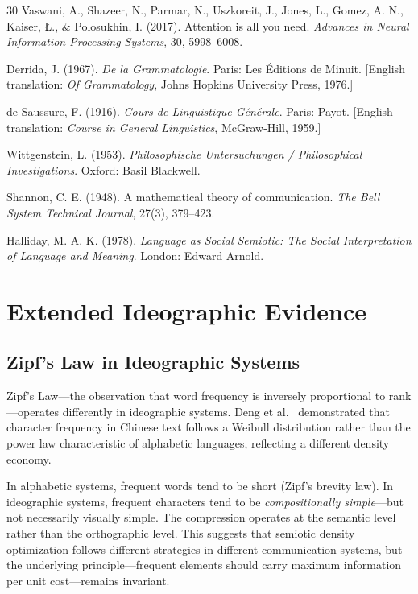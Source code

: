 \documentclass[12pt,a4paper]{article}
\begin{document}
\begin{thebibliography}{30}
Vaswani, A., Shazeer, N., Parmar, N., Uszkoreit, J., Jones, L., Gomez, A. N., Kaiser, {\L}., \& Polosukhin, I. (2017).
Attention is all you need.
\textit{Advances in Neural Information Processing Systems}, 30, 5998--6008.

Derrida, J. (1967).
\textit{De la Grammatologie}.
Paris: Les \'Editions de Minuit.
[English translation: \textit{Of Grammatology}, Johns Hopkins University Press, 1976.]

de Saussure, F. (1916).
\textit{Cours de Linguistique G\'en\'erale}.
Paris: Payot.
[English translation: \textit{Course in General Linguistics}, McGraw-Hill, 1959.]

Wittgenstein, L. (1953).
\textit{Philosophische Untersuchungen / Philosophical Investigations}.
Oxford: Basil Blackwell.

Shannon, C. E. (1948).
A mathematical theory of communication.
\textit{The Bell System Technical Journal}, 27(3), 379--423.

Halliday, M. A. K. (1978).
\textit{Language as Social Semiotic: The Social Interpretation of Language and Meaning}.
London: Edward Arnold.

\end{thebibliography}

\appendix
\section{Extended Ideographic Evidence}
\label{appendix:ideographic}

\subsection{Zipf's Law in Ideographic Systems}

Zipf's Law---the observation that word frequency is inversely proportional to rank---operates differently in ideographic systems.
Deng et al.\ \cite{deng2014} demonstrated that character frequency in Chinese text follows a Weibull distribution rather than the power law characteristic of alphabetic languages, reflecting a different density economy.

In alphabetic systems, frequent words tend to be short (Zipf's brevity law).
In ideographic systems, frequent characters tend to be \textit{compositionally simple}---but not necessarily visually simple.
The compression operates at the semantic level rather than the orthographic level.
This suggests that semiotic density optimization follows different strategies in different communication systems, but the underlying principle---frequent elements should carry maximum information per unit cost---remains invariant.
\end{document}
